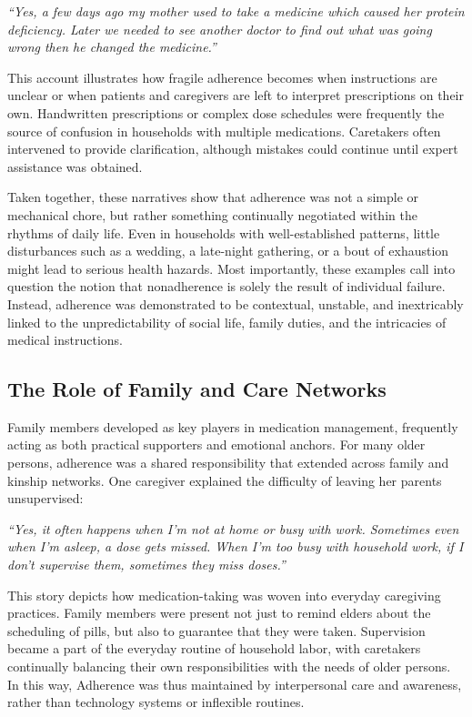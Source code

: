 \documentclass[acmlarge]{acmart}
\begin{document}
\emph{``Yes, a few days ago my mother used to take a medicine which
caused her protein deficiency. Later we needed to see another doctor to
find out what was going wrong then he changed the medicine.''}

This account illustrates how fragile adherence becomes when instructions
are unclear or when patients and caregivers are left to interpret
prescriptions on their own. Handwritten prescriptions or complex dose
schedules were frequently the source of confusion in households with
multiple medications. Caretakers often intervened to provide
clarification, although mistakes could continue until expert assistance
was obtained.

Taken together, these narratives show that adherence was not a simple or
mechanical chore, but rather something continually negotiated within the
rhythms of daily life. Even in households with well-established
patterns, little disturbances such as a wedding, a late-night gathering,
or a bout of exhaustion might lead to serious health hazards. Most
importantly, these examples call into question the notion that
nonadherence is solely the result of individual failure. Instead,
adherence was demonstrated to be contextual, unstable, and inextricably
linked to the unpredictability of social life, family duties, and the
intricacies of medical instructions.

\subsection{The Role of Family and Care Networks~}
Family members developed as key players in medication management,
frequently acting as both practical supporters and emotional anchors.
For many older persons, adherence was a shared responsibility that
extended across family and kinship networks. One caregiver explained the
difficulty of leaving her parents unsupervised:

\emph{``Yes, it often happens when I'm not at home or busy with work.
Sometimes even when I'm asleep, a dose gets missed. When I'm too busy
with household work, if I don't supervise them, sometimes they miss
doses.''}

This story depicts how medication-taking was woven into everyday
caregiving practices. Family members were present not just to remind
elders about the scheduling of pills, but also to guarantee that they
were taken. Supervision became a part of the everyday routine of
household labor, with caretakers continually balancing their own
responsibilities with the needs of older persons. In this way, Adherence
was thus maintained by interpersonal care and awareness, rather than
technology systems or inflexible routines.
\end{document}
